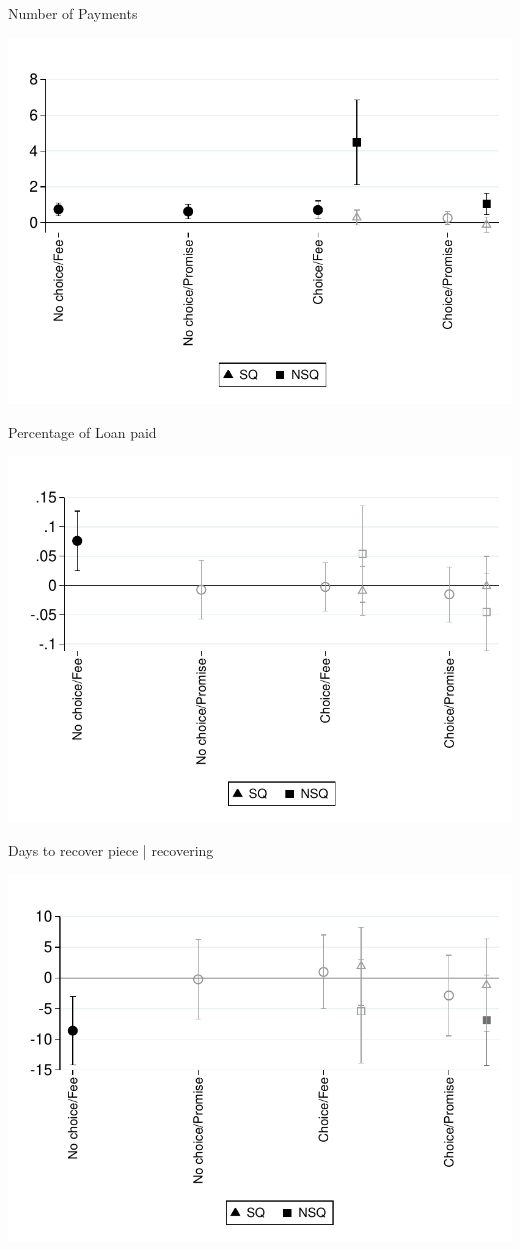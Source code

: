 \documentclass[9pt]{beamer}
\begin{document}
\begin{frame}{Number of Payments}
    \begin{center}
        \includegraphics[width=.70\textwidth]{Figuras/te_graph_num_p.pdf}
    \end{center}
\end{frame}


\begin{frame}{Percentage of Loan paid}
    \begin{center}
        \includegraphics[width=.70\textwidth]{Figuras/te_graph_sum_porcp_c.pdf}
    \end{center}
\end{frame}


\begin{frame}{Days to recover piece | recovering}
    \begin{center}
        \includegraphics[width=.70\textwidth]{Figuras/te_graph_dias_al_desempenyo.pdf}
    \end{center}
\end{frame}
\end{document}
